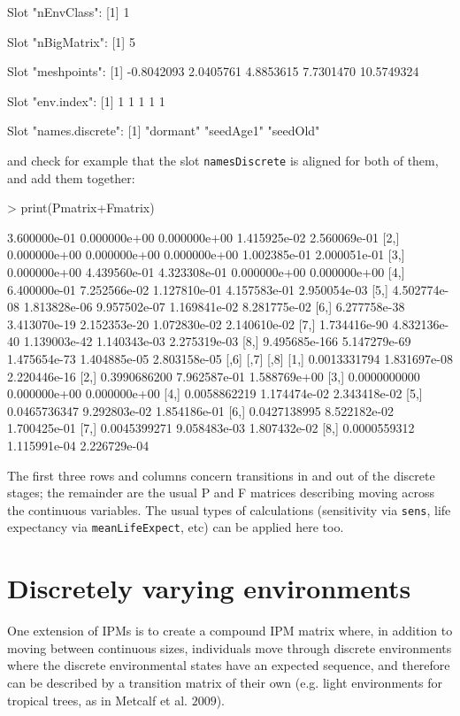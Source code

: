 \documentclass{article}
\begin{document}
\begin{Schunk}
\begin{Soutput}
Slot "nEnvClass":
[1] 1

Slot "nBigMatrix":
[1] 5

Slot "meshpoints":
[1] -0.8042093  2.0405761  4.8853615  7.7301470 10.5749324

Slot "env.index":
[1] 1 1 1 1 1

Slot "names.discrete":
[1] "dormant"  "seedAge1" "seedOld" 
\end{Soutput}
\end{Schunk}
and check for example that the slot {\tt namesDiscrete} is aligned for both of them, and add
them together:
\begin{Schunk}
\begin{Sinput}
> print(Pmatrix+Fmatrix)
\end{Sinput}
\begin{Soutput}
              [,1]         [,2]         [,3]         [,4]         [,5]
[1,]  3.600000e-01 0.000000e+00 0.000000e+00 1.415925e-02 2.560069e-01
[2,]  0.000000e+00 0.000000e+00 0.000000e+00 1.002385e-01 2.000051e-01
[3,]  0.000000e+00 4.439560e-01 4.323308e-01 0.000000e+00 0.000000e+00
[4,]  6.400000e-01 7.252566e-02 1.127810e-01 4.157583e-01 2.950054e-03
[5,]  4.502774e-08 1.813828e-06 9.957502e-07 1.169841e-02 8.281775e-02
[6,]  6.277758e-38 3.413070e-19 2.152353e-20 1.072830e-02 2.140610e-02
[7,]  1.734416e-90 4.832136e-40 1.139003e-42 1.140343e-03 2.275319e-03
[8,] 9.495685e-166 5.147279e-69 1.475654e-73 1.404885e-05 2.803158e-05
             [,6]         [,7]         [,8]
[1,] 0.0013331794 1.831697e-08 2.220446e-16
[2,] 0.3990686200 7.962587e-01 1.588769e+00
[3,] 0.0000000000 0.000000e+00 0.000000e+00
[4,] 0.0058862219 1.174474e-02 2.343418e-02
[5,] 0.0465736347 9.292803e-02 1.854186e-01
[6,] 0.0427138995 8.522182e-02 1.700425e-01
[7,] 0.0045399271 9.058483e-03 1.807432e-02
[8,] 0.0000559312 1.115991e-04 2.226729e-04
\end{Soutput}
\end{Schunk}
The first three rows and columns concern transitions in and out of the discrete stages; the remainder are the usual P and F matrices describing moving across the continuous variables. The usual types of calculations (sensitivity via {\tt sens}, life expectancy via {\tt meanLifeExpect}, etc) can be applied here too.    

\section{Discretely varying environments}
One extension of IPMs is to create a compound IPM matrix where, in addition to
moving between continuous sizes, individuals move through discrete environments where the discrete environmental states have an expected sequence, and therefore can be described by a transition matrix of their own (e.g. light environments for tropical trees, as in Metcalf et al. $2009$).
\end{document}

